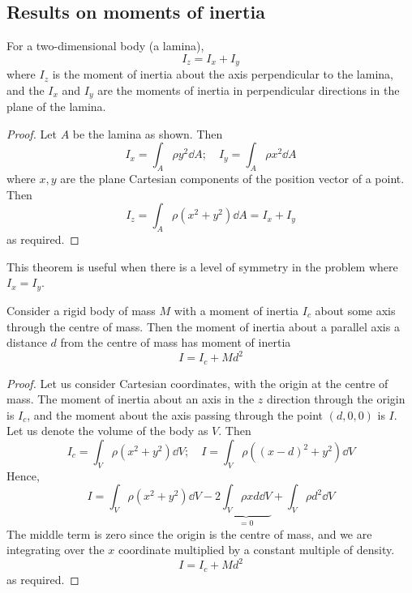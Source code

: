 \subsection{Results on moments of inertia}
\begin{theorem}
	For a two-dimensional body (a lamina),
	\[
		I_z = I_x + I_y
	\]
	where \(I_z\) is the moment of inertia about the axis perpendicular to the lamina, and the \(I_x\) and \(I_y\) are the moments of inertia in perpendicular directions in the plane of the lamina.
\end{theorem}
\begin{proof}
	Let \(A\) be the lamina as shown.
	Then
	\[
		I_x = \int_A \rho y^2 \dd{A};\quad I_y = \int_A \rho x^2 \dd{A}
	\]
	where \(x, y\) are the plane Cartesian components of the position vector of a point.
	Then
	\[
		I_z = \int_A \rho (x^2 + y^2) \dd{A} = I_x + I_y
	\]
	as required.
\end{proof}
This theorem is useful when there is a level of symmetry in the problem where \(I_x = I_y\).
\begin{theorem}
	Consider a rigid body of mass \(M\) with a moment of inertia \(I_c\) about some axis through the centre of mass.
	Then the moment of inertia about a parallel axis a distance \(d\) from the centre of mass has moment of inertia
	\[
		I = I_c + Md^2
	\]
\end{theorem}
\begin{proof}
	Let us consider Cartesian coordinates, with the origin at the centre of mass.
	The moment of inertia about an axis in the \(z\) direction through the origin is \(I_c\), and the moment about the axis passing through the point \((d, 0, 0)\) is \(I\).
	Let us denote the volume of the body as \(V\).
	Then
	\[
		I_c = \int_V \rho (x^2 + y^2) \dd{V};\quad I = \int_V \rho ((x-d)^2 + y^2) \dd{V}
	\]
	Hence,
	\[
		I = \int_V \rho (x^2 + y^2) \dd{V} - 2\underbrace{\int_V \rho xd \dd{V}}_{=0} + \int_V \rho d^2 \dd{V}
	\]
	The middle term is zero since the origin is the centre of mass, and we are integrating over the \(x\) coordinate multiplied by a constant multiple of density.
	\[
		I = I_c + Md^2
	\]
	as required.
\end{proof}

